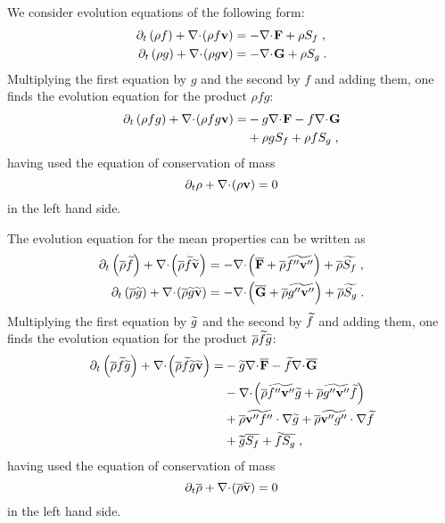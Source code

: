 We consider evolution equations of the following form:
\begin{subequations}
  \begin{align}
    \ptp{\rho f}{t} + \dvp{\rho f\mathbf{v}}& =-\dv{\mathbf{F}} + \rho S_f \;,\\
    \ptp{\rho g}{t} + \dvp{\rho g\mathbf{v}}& =-\dv{\mathbf{G}} + \rho S_g \;.
  \end{align}
\end{subequations}
Multiplying the first equation by $g$ and the second by $f$ and adding them, one finds the evolution equation for the product $\rho f g$:
\begin{equation}\label{equ:fg}
  \begin{split}
    \ptp{\rho fg}{t} + \dvp{\rho fg\mathbf{v}}=&-g\dv{\mathbf{F}}-f\dv{\mathbf{G}}\\
    &+ \rho gS_f + \rho fS_g\;,
  \end{split}
\end{equation}
having used the equation of conservation of mass
\begin{equation}
  \pt{\rho}{t} + \dvp{\rho\mathbf{v}}=0
\end{equation}
in the left hand side.

The evolution equation for the mean properties can be written as
\begin{subequations}
  \begin{align}
    \ptp{\avr{\rho}\avf{f}}{t} + \dvp{\avr{\rho}\avf{f}\avf{\mathbf{v}}} &=
    -\dvp{\avr{\mathbf{F}}+\avr{\rho}\avf{f''\mathbf{v}''}} + \avr{\rho}\avf{S_f} \;,\\
    \ptp{\avr{\rho}\avf{g}}{t} + \dvp{\avr{\rho}\avf{g}\avf{\mathbf{v}}} &=
    -\dvp{\avr{\mathbf{G}}+\avr{\rho}\avf{g''\mathbf{v}''}} + \avr{\rho}\avf{S_g} \;.
  \end{align}
\end{subequations}
Multiplying the first equation by $\avf{g}$ and the second by $\avf{f}$ and adding them, one finds the evolution equation for the product $\avr{\rho}\avf{f}\avf{g}$:
\begin{equation}\label{equ:avfg}
  \begin{split}
    \ptp{\avr{\rho} \avf{f}\avf{g}}{t} + \dvp{\avr{\rho} \avf{f}\avf{g}\avf{\mathbf{v}}}=
    &-\avf{g}\dv{\avr{\mathbf{F}}}-\avf{f}\dv{\avr{\mathbf{G}}}\\
    &-\dvp{\avr{\rho}\avf{f''\mathbf{v}''}\avf{g}+\avr{\rho}\avf{g''\mathbf{v}''}\avf{f}}\\
    &+ \avr{\rho}\avf{\mathbf{v}''f''}\cdot\nabla \avf{g}
     + \avr{\rho}\avf{\mathbf{v}''g''}\cdot\nabla \avf{f}\\
    &+ \avf{g}\avr{S_f} + \avf{f}\avr{S_g}\;,
  \end{split}
\end{equation}
having used the equation of conservation of mass
\begin{equation}
  \pt{\avr{\rho}}{t} + \dvp{\avr{\rho}\avf{\mathbf{v}}}=0
\end{equation}
in the left hand side.

